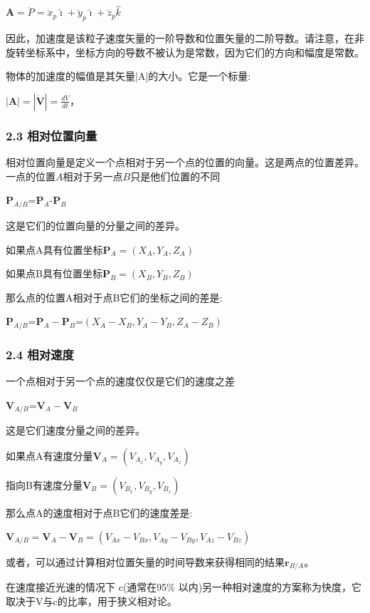 $\mathbf{A}=\ddot{P}=\ddot{x}_p\hat{\imath}+\ddot{y}_p\hat{\imath}+\ddot{z}_p\hat{k}$

因此，加速度是该粒子速度矢量的一阶导数和位置矢量的二阶导数。请注意，在非旋转坐标系中，坐标方向的导数不被认为是常数，因为它们的方向和幅度是常数。

物体的加速度的幅值是其矢量|A|的大小。它是一个标量:

$\left| \mathbf{A} \right| = \left| \dot{\mathbf{V}} \right| = \frac{dV}{dt}$，

\subsubsection{2.3 相对位置向量}

相对位置向量是定义一个点相对于另一个点的位置的向量。这是两点的位置差异。 一点的位置$A$相对于另一点$B$只是他们位置的不同

$\mathbf{P}_{A/B}$=$\mathbf{P}_{A}$-$\mathbf{P}_{B}$

这是它们的位置向量的分量之间的差异。

如果点A具有位置坐标$\mathbf{P}_{A}=(X_{A},Y_{A},Z_{A})$

如果点B具有位置坐标$\mathbf{P}_{B}=(X_{B},Y_{B},Z_{B})$

那么点的位置A相对于点B它们的坐标之间的差是:

$\mathbf{P}_{A/B}$=$\mathbf{P}_{A}-\mathbf{P}_{B}$=$(X_{A}-X_{B},Y_{A}-Y_{B},Z_{A}-Z_{B})$

\subsubsection{2.4 相对速度}

一个点相对于另一个点的速度仅仅是它们的速度之差

$\mathbf{V}_{A/B}$=$\mathbf{V}_{A}-\mathbf{V}_{B}$

这是它们速度分量之间的差异。

如果点A有速度分量$\mathbf{V}_{A}=(V_{A_x},V_{A_y},V_{A_z})$

指向B有速度分量$\mathbf{V}_{B}=(V_{B_x},V_{B_y},V_{B_z})$

那么点A的速度相对于点B它们的速度差是:

$\mathbf{V}_{A/B} = \mathbf{V}_A - \mathbf{V}_B = \left( V_{Ax} - V_{Bx}, V_{Ay} - V_{By}, V_{Az} - V_{Bz} \right)$

或者，可以通过计算相对位置矢量的时间导数来获得相同的结果$\mathbf{r}_{B/A}$。

在速度接近光速的情况下 c(通常在95\% 以内)另一种相对速度的方案称为快度，它取决于V与c的比率，用于狭义相对论。

